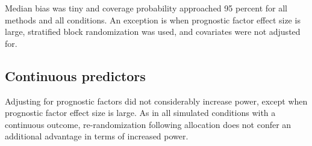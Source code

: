 Median bias was tiny and coverage probability approached 95 percent for all methods and all conditions.
An exception is when prognostic factor effect size is large, stratified block randomization was used, and covariates were not adjusted for.

\subsection{Continuous predictors}
Adjusting for prognostic factors did not considerably increase power, except when prognostic factor effect size is large.
As in all simulated conditions with a continuous outcome, re-randomization following allocation does not confer an additional advantage in terms of increased power.